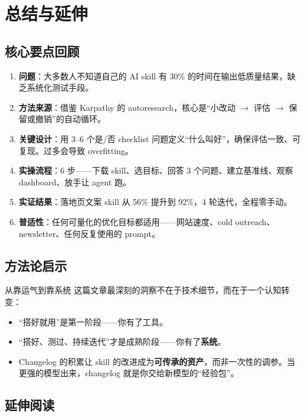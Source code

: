 \section{总结与延伸}

\subsection{核心要点回顾}

\begin{enumerate}
    \item \textbf{问题}：大多数人不知道自己的 AI skill 有 30\% 的时间在输出低质量结果，缺乏系统化测试手段。
    \item \textbf{方法来源}：借鉴 Karpathy 的 autoresearch，核心是``小改动 $\to$ 评估 $\to$ 保留或撤销''的自动循环。
    \item \textbf{关键设计}：用 3--6 个是/否 checklist 问题定义``什么叫好''，确保评估一致、可复现。过多会导致 overfitting。
    \item \textbf{实操流程}：6 步——下载 skill、选目标、回答 3 个问题、建立基准线、观察 dashboard、放手让 agent 跑。
    \item \textbf{实证结果}：落地页文案 skill 从 56\% 提升到 92\%，4 轮迭代，全程零手动。
    \item \textbf{普适性}：任何可量化的优化目标都适用——网站速度、cold outreach、newsletter、任何反复使用的 prompt。
\end{enumerate}

\subsection{方法论启示}

\begin{importantbox}{从靠运气到靠系统}
这篇文章最深刻的洞察不在于技术细节，而在于一个认知转变：
\begin{itemize}
    \item ``搭好就用''是第一阶段——你有了工具。
    \item ``搭好、测过、持续迭代''才是成熟阶段——你有了\textbf{系统}。
    \item Changelog 的积累让 skill 的改进成为\textbf{可传承的资产}，而非一次性的调参。当更强的模型出来，changelog 就是你交给新模型的``经验包''。
\end{itemize}
\end{importantbox}

\subsection{延伸阅读}

